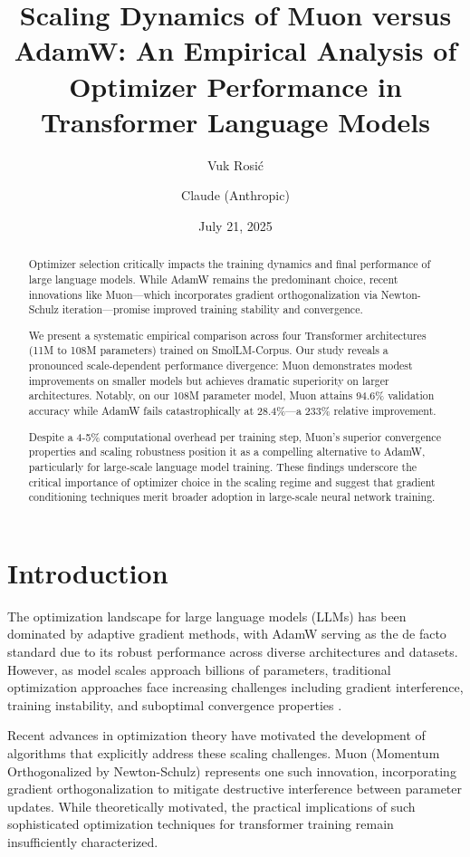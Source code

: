 \documentclass[11pt,a4paper]{article}
\title{\Large\bfseries Scaling Dynamics of Muon versus AdamW: An Empirical Analysis of Optimizer Performance in Transformer Language Models}
\author[1]{Vuk Rosić}
\author[2]{Claude (Anthropic)}
\affil[1]{Óbuda University, \texttt{vukrosic1@gmail.com}}
\affil[2]{Anthropic}
\date{July 21, 2025}
\begin{document}
\maketitle

\begin{abstract}
Optimizer selection critically impacts the training dynamics and final performance of large language models. While AdamW remains the predominant choice, recent innovations like Muon—which incorporates gradient orthogonalization via Newton-Schulz iteration—promise improved training stability and convergence. 

We present a systematic empirical comparison across four Transformer architectures (11M to 108M parameters) trained on SmolLM-Corpus. Our study reveals a pronounced scale-dependent performance divergence: Muon demonstrates modest improvements on smaller models but achieves dramatic superiority on larger architectures. Notably, on our 108M parameter model, Muon attains 94.6\% validation accuracy while AdamW fails catastrophically at 28.4\%—a 233\% relative improvement. 

Despite a 4-5\% computational overhead per training step, Muon's superior convergence properties and scaling robustness position it as a compelling alternative to AdamW, particularly for large-scale language model training. These findings underscore the critical importance of optimizer choice in the scaling regime and suggest that gradient conditioning techniques merit broader adoption in large-scale neural network training.
\end{abstract}

\section{Introduction}

The optimization landscape for large language models (LLMs) has been dominated by adaptive gradient methods, with AdamW \cite{loshchilov2017decoupled} serving as the de facto standard due to its robust performance across diverse architectures and datasets. However, as model scales approach billions of parameters, traditional optimization approaches face increasing challenges including gradient interference, training instability, and suboptimal convergence properties \cite{vaswani2017attention,touvron2023llama}.

Recent advances in optimization theory have motivated the development of algorithms that explicitly address these scaling challenges. Muon (Momentum Orthogonalized by Newton-Schulz) represents one such innovation, incorporating gradient orthogonalization to mitigate destructive interference between parameter updates. While theoretically motivated, the practical implications of such sophisticated optimization techniques for transformer training remain insufficiently characterized.
\end{document}
